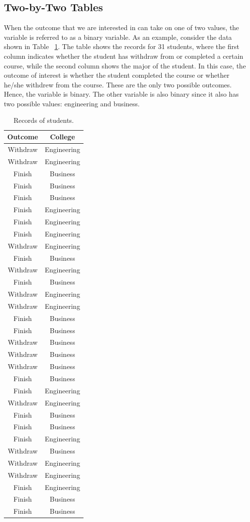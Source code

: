 \documentclass[a4paper,12pt,oneside]{book}
\begin{document}
\subsection{Two-by-Two Tables}
When the outcome that we are interested in can take on one of two values, the variable is referred to as a binary variable. As an example, consider the data shown in Table ~\ref{table:first}. The table shows the records for 31 
students, where the first column indicates whether the student has withdraw from or completed a certain course, while the second column shows the major of the student. In this case, the outcome of interest is 
whether the student completed the course or whether he/she withdrew from the course. These are the only two possible outcomes. Hence, the variable is binary. The other variable is also binary since it also has two 
possible values: engineering and business. 
\begin{longtable}[c]{ c c }
	\caption{Records of students.\label{table:first}}\\
		\hline
		\bf Outcome & \bf College \\
		\hline
		Withdraw & Engineering \\
		Withdraw & Engineering \\
		Finish & Business \\
		Finish & Business \\
		Finish & Business \\
		Finish & Engineering \\
		Finish & Engineering \\
		Finish & Engineering \\
		Withdraw & Engineering \\
		Finish & Business \\
		Withdraw & Engineering \\
		Finish & Business \\
		Withdraw & Engineering \\
		Withdraw & Engineering \\
		Finish & Business \\
		Finish & Business \\
		Withdraw & Business \\
		Withdraw & Business \\
		Withdraw & Business \\
		Finish & Business \\
		Finish & Engineering \\
		Withdraw & Engineering \\
		Finish & Business \\
		Finish & Business \\
		Finish & Engineering \\
		Withdraw & Business \\
		Withdraw & Engineering \\
		Withdraw & Engineering \\
		Finish & Engineering \\
		Finish & Business \\
		Finish & Business \\
	\hline
\end{longtable}
\end{document}
